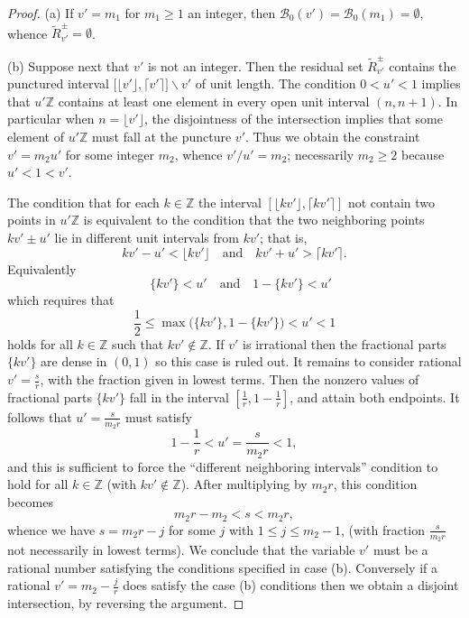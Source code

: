 \documentclass[12pt,letterpaper, reqno]{amsart}
\theoremstyle{definition}
\theoremstyle{remark}
\newcommand{\ZZ}{\ensuremath{\mathbb{Z}}}
\newcommand{\uu}{{u'}}
\newcommand{\vv}{{v'}}
\newcommand{\sB}{{\mathcal B}}
\newcommand{\floor}[1]{\lfloor{#1}\rfloor}
\newcommand{\ceil}[1]{\lceil{#1}\rceil}
\begin{document}
\begin{proof}
(a) If $\vv= {m_1}$ for $m_1 \ge 1$ an integer,
then  $\sB_0({\vv})=\sB_0(m_1) = \emptyset$, whence 
$\widetilde{R}_\vv^{\pm} = \emptyset$.

(b) Suppose next that ${\vv}$ is not an integer. Then the residual set $\widetilde{R}^\pm_\vv$ contains the punctured interval $\big[\floor\vv,\ceil\vv\big]\smallsetminus\vv$ of unit length.
The condition $0< {\uu} < 1$ implies that ${\uu} \ZZ$
contains  at least one element in every open unit interval $(n, n+1)$.
In particular when $n = \floor\vv$, the
disjointness of the intersection implies that some element of $\uu\ZZ$ must
fall at the puncture $\vv$.
Thus we obtain the constraint ${\vv} = m_2 {\uu}$ for some integer $m_2$,
whence  $\vv/\uu = {m_2}$; 
necessarily   $m_2 \ge 2$ because ${\uu} < 1 < {\vv}$.

The condition that for each $k \in \ZZ$ the interval $[ \floor{k\vv} ,\ceil{k\vv}]$  not contain
two points in ${\uu}\ZZ$ is  equivalent to the condition that the two neighboring points  
${k}{\vv}\pm {\uu}$
lie in different unit intervals from ${k}{\vv}$; that is,   
\[ 
k \vv- \uu <\floor{ k \vv} \quad\text{and}\quad  k \vv + \uu > \ceil{ {k}{\vv} } . \]
Equivalently
\[ 
\quad \{ k \vv\} < 
\uu \quad\text{and}\quad  1-\{ k \vv\} <\uu \]
which requires that
$$ 
\frac1 2 \leq  \max\Big(\{ {k}{\vv} \}, 1- \{ {k}{\vv} \} \Big)<  {\uu}   <1
$$
holds for all $k \in \ZZ$ such that $k\vv \not\in\ZZ$. If $\vv$ is irrational then the fractional parts $ \{ {k}{\vv} \}$
are dense in $(0,1)$ so this case is ruled out. 
It remains to consider rational  $\vv= \frac{s}{r}$, with the fraction given
in lowest terms. Then the nonzero values of fractional parts $\{ {k}{\vv} \}$ fall in the interval
$[ \frac{1}{r}, 1- \frac{1}{r} ]$, and attain both endpoints. It follows that 
 ${\uu} = \frac{s}{m_2 r}$  must satisfy
$$
1-\frac{1}{r} < {\uu} = \frac{s}{m_2 r} < 1,
$$
and this is sufficient  to force the ``different neighboring intervals'' condition to hold for all $k \in \ZZ$ (with $ k \vv\not\in\ZZ$).
After multiplying by $m_2 r$, this condition becomes
\[ m_2 r - m_2 < s < m_2 r,  \]
whence we have $s= m_2 r- j$ for some $j$ with $1 \le j \le m_2-1$, 
(with fraction $\frac{s}{m_2 r}$ not necessarily  in lowest terms).
We conclude that the variable $\vv$ must be a rational number satisfying the conditions
specified in case (b). Conversely if a rational $\vv= m_2-\frac{j}{r}$ does satisfy
the case (b) conditions then we obtain a disjoint intersection, by reversing the argument.
\end{proof}
\end{document}
